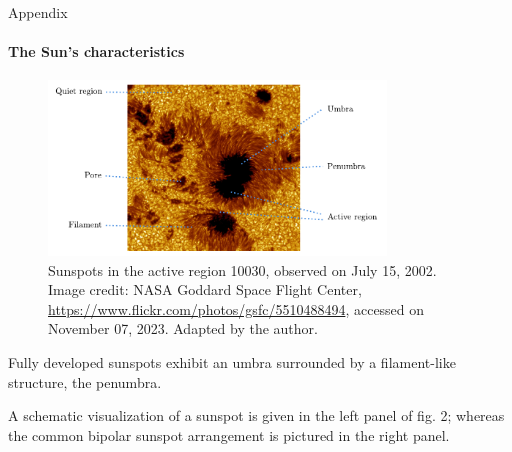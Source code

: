 \documentclass{beamer}
\begin{document}
\begin{frame}[allowframebreaks]{Appendix}
	\framesubtitle{The Sun's characteristics}
	\begin{figure}[h]
		\centering
		\includegraphics[width=0.8\textwidth]{figures/thesis/Sunspots.pdf}
		\caption{Sunspots in the active region 10030, observed on July 15, 2002. Image credit: NASA Goddard Space Flight Center, \url{https://www.flickr.com/photos/gsfc/5510488494}, accessed on November 07, 2023. Adapted by the author.}
		\label{fig:Sunspots}
	\end{figure}
	
	Fully developed sunspots exhibit an umbra surrounded by a filament-like structure, the penumbra.
	
	A schematic visualization of a sunspot is given in the left panel of fig. 2; whereas the common bipolar sunspot arrangement is pictured in the right panel.
	

\end{frame}
\end{document}
